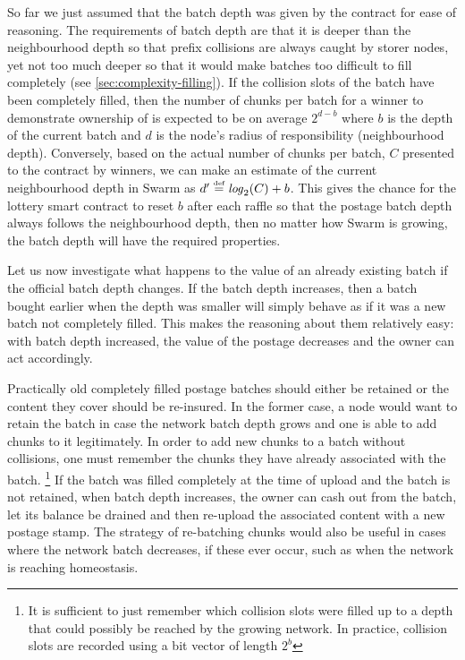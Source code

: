 So far we just assumed that the batch depth was given by the contract for ease of reasoning. The requirements of batch depth are that it is deeper than the neighbourhood depth so that prefix collisions are always caught by storer nodes, yet not too much deeper so that it would make batches too difficult to fill completely (see \ref{sec:complexity-filling}). If the collision slots of the batch have been completely filled, then the number of chunks per batch for a winner to demonstrate ownership of is expected to be on average $2^{d-b}$ where $b$ is the depth of the current batch and $d$ is the node's radius of responsibility (neighbourhood depth). Conversely, based on the actual number of chunks per batch, $C$ presented to the contract by winners, we can make an estimate of the current neighbourhood depth in Swarm as $d'\overset{\textrm{\tiny def}}{=}\mathit{log}_2(C)+b$. This gives the chance for the lottery smart contract to reset $b$ after each raffle so that the postage batch depth always follows the neighbourhood depth, then no matter how Swarm is growing, the batch depth will have the required properties. 

Let us now investigate what happens to the value of an already existing batch if the official batch depth changes. If the batch depth increases, then a batch bought earlier when the depth was smaller will simply behave as if it was a new batch not completely filled. This makes the reasoning about them relatively easy: with batch depth increased, the value of the postage decreases and the owner can act accordingly.

Practically old completely filled postage batches should either be retained or the content they cover should be re-insured. In the former case, a node would want to retain the batch in case the network batch depth grows and one is able to add chunks to it legitimately. 
In order to add new chunks to a batch without collisions, one must remember the chunks they have already associated with the batch.%
%
\footnote{It is sufficient to just remember which collision slots were filled up to a depth that could possibly be reached by the growing network. In practice, collision slots are recorded using a bit vector of length  $2^b$}
%
If the batch was filled completely at the time of upload and the batch is not retained, when batch depth increases, the owner can cash out from the batch, let its balance be drained and then re-upload the associated content with a new postage stamp. The strategy of re-batching chunks would also be useful in cases where the network batch decreases, if these ever occur, such as when the network is reaching homeostasis.

